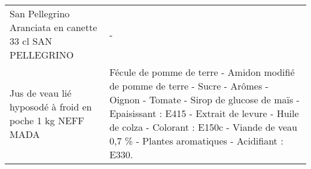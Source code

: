 \begin{longtable}{p{5cm}p{10cm}}
                                                 San Pellegrino Aranciata en canette 33 cl SAN PELLEGRINO &                                                                                                                                                                                                                                                                                                                                                                                                                                                                                                                                                                                                                                                                                                                                                                                                                                                                                                                                                                                                                                        - \\
                                                 Jus de veau lié hyposodé à froid en poche 1 kg NEFF MADA &                                                                                                                                                                                                                                                                                                                                                                                                                                                                                                                                                                                                                                                                                                                                                                 Fécule de pomme de terre - Amidon modifié de pomme de terre - Sucre - Arômes - Oignon - Tomate - Sirop de glucose de maïs - Epaisissant : E415 - Extrait de levure - Huile de colza - Colorant : E150c - Viande de veau 0,7 \% - Plantes aromatiques - Acidifiant : E330. \\

\end{longtable}

